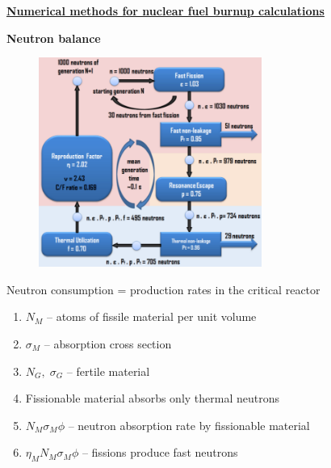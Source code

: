 \documentclass[aspectratio=1610,pdftex,dvipsnames,compress,xcolor={dvipsnames}]{beamer}
\begin{document}
\begin{frame}[plain]{}
    \centering\textbf{\href{http://montecarlo.vtt.fi/download/S32.pdf}{Numerical methods for nuclear fuel burnup calculations}}
\end{frame}


\begin{frame}[plain]{}
    \centering\LARGE\textbf{Neutron balance}
\end{frame}


\addtocounter{framenumber}{-2} 
\begin{frame}{}
    \begin{figure}
        \centering
        \includegraphics[width=0.65\textwidth]{neutron.balance.png}
    \end{figure}
\end{frame}


\begin{frame}{Neutron consumption = production rates in the critical reactor}
    \begin{enumerate}[series=outerlist,topsep=0pt,itemsep=21pt,leftmargin=*,label=(\arabic*)]
        \item[]$N_M$ -- atoms of fissile material per unit volume
        \item[]$\sigma_M$ -- absorption cross section
        \item[]$N_G, \; \sigma_G$ -- fertile material
        \item[]Fissionable material absorbs only thermal neutrons
        \item[]$N_M\sigma_M\phi$ -- neutron absorption rate by fissionable material
        \item[]$\eta_M N_M\sigma_M\phi$ -- fissions produce fast neutrons
    \end{enumerate}
\end{frame}
\end{document}
